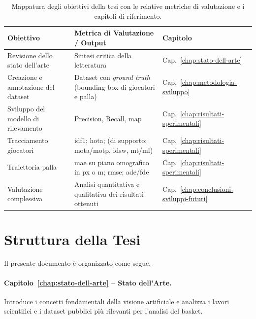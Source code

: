 \documentclass[12pt,a4paper,openright,twoside]{book}
\begin{document}
\begin{table}[h!]
  \centering
  \caption{Mappatura degli obiettivi della tesi con le relative metriche di valutazione 
  e i capitoli di riferimento.}
  \label{tab:obiettivi_metriche_capitoli}
  \begin{tabularx}{\textwidth}{l Y l}
    \toprule
    \textbf{Obiettivo} & \textbf{Metrica di Valutazione / Output} & \textbf{Capitolo} \\
    \midrule
    Revisione dello stato dell'arte & Sintesi critica della letteratura 
    & Cap.~\ref{chap:stato-dell-arte} \\
    \addlinespace
    Creazione e annotazione del dataset & Dataset con \textit{ground truth} 
    (bounding box di giocatori e palla) & Cap.~\ref{chap:metodologia-sviluppo} \\
    \addlinespace
    Sviluppo del modello di rilevamento & Precision, Recall, \ac{map} 
    & Cap.~\ref{chap:risultati-sperimentali} \\
    \addlinespace
    Tracciamento giocatori & \ac{idf1}; \ac{hota}; 
    (di supporto: \ac{mota}/\ac{motp}, \acf{idsw}, \acf{mt}/\acf{ml}) 
    & Cap.~\ref{chap:risultati-sperimentali} \\
    \addlinespace
    Traiettoria palla & \acf{mae} su piano omografico in \acf{px} o \acf{m}; 
    \ac{rmse}; \acf{ade}/\acf{fde} & Cap.~\ref{chap:risultati-sperimentali} \\
    \addlinespace
    Valutazione complessiva & Analisi quantitativa e qualitativa dei risultati 
    ottenuti & Cap.~\ref{chap:conclusioni-sviluppi-futuri} \\
    \bottomrule
  \end{tabularx}
\end{table}

\section{Struttura della Tesi}
\label{sec:struttura-tesi}
Il presente documento è organizzato come segue.

\paragraph{Capitolo~\ref{chap:stato-dell-arte} -- Stato dell'Arte.} 
Introduce i concetti fondamentali della visione artificiale e 
analizza i lavori scientifici e i dataset pubblici più 
rilevanti per l'analisi del basket.
\end{document}
